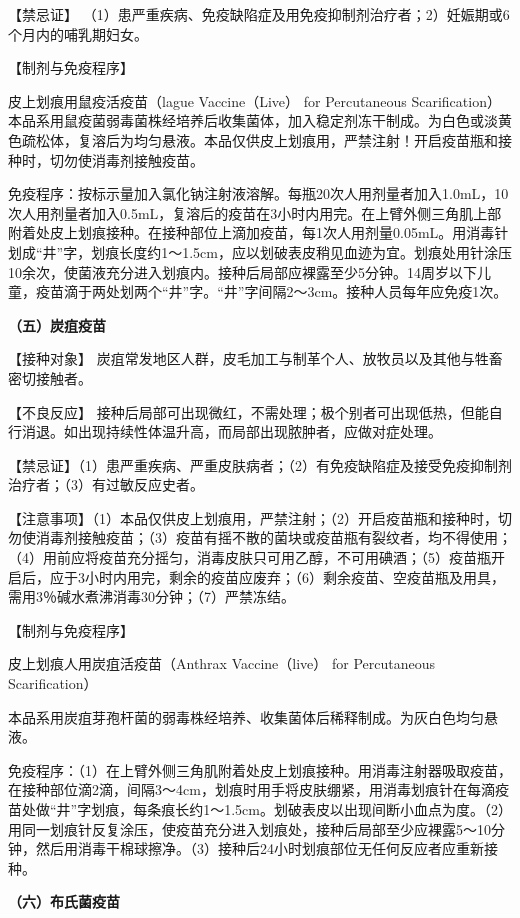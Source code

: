 【禁忌证】
（1）患严重疾病、免疫缺陷症及用免疫抑制剂治疗者；2）妊娠期或6个月内的哺乳期妇女。

【制剂与免疫程序】

皮上划痕用鼠疫活疫苗（lague Vaccine（Live） for Percutaneous
Scarification）本品系用鼠疫菌弱毒菌株经培养后收集菌体，加入稳定剂冻干制成。为白色或淡黄色疏松体，复溶后为均匀悬液。本品仅供皮上划痕用，严禁注射！开启疫苗瓶和接种时，切勿使消毒剂接触疫苗。

免疫程序：按标示量加入氯化钠注射液溶解。每瓶20次人用剂量者加入1.0mL，10次人用剂量者加入0.5mL，复溶后的疫苗在3小时内用完。在上臂外侧三角肌上部附着处皮上划痕接种。在接种部位上滴加疫苗，每1次人用剂量0.05mL。用消毒针划成“井”字，划痕长度约1～1.5cm，应以划破表皮稍见血迹为宜。划痕处用针涂压10余次，使菌液充分进入划痕内。接种后局部应裸露至少5分钟。14周岁以下儿童，疫苗滴于两处划两个“井”字。“井”字间隔2～3cm。接种人员每年应免疫1次。

\textbf{（五）炭疽疫苗}

【接种对象】
炭疽常发地区人群，皮毛加工与制革个人、放牧员以及其他与牲畜密切接触者。

【不良反应】
接种后局部可出现微红，不需处理；极个别者可出现低热，但能自行消退。如出现持续性体温升高，而局部出现脓肿者，应做对症处理。

【禁忌证】（1）患严重疾病、严重皮肤病者；（2）有免疫缺陷症及接受免疫抑制剂治疗者；（3）有过敏反应史者。

【注意事项】（1）本品仅供皮上划痕用，严禁注射；（2）开启疫苗瓶和接种时，切勿使消毒剂接触疫苗；（3）疫苗有摇不散的菌块或疫苗瓶有裂纹者，均不得使用；（4）用前应将疫苗充分摇匀，消毒皮肤只可用乙醇，不可用碘酒；（5）疫苗瓶开启后，应于3小时内用完，剩余的疫苗应废弃；（6）剩余疫苗、空疫苗瓶及用具，需用3％碱水煮沸消毒30分钟；（7）严禁冻结。

【制剂与免疫程序】

皮上划痕人用炭疽活疫苗（Anthrax Vaccine（live） for Percutaneous
Scarification）

本品系用炭疽芽孢杆菌的弱毒株经培养、收集菌体后稀释制成。为灰白色均匀悬液。

免疫程序：（1）在上臂外侧三角肌附着处皮上划痕接种。用消毒注射器吸取疫苗，在接种部位滴2滴，间隔3～4cm，划痕时用手将皮肤绷紧，用消毒划痕针在每滴疫苗处做“井”字划痕，每条痕长约1～1.5cm。划破表皮以出现间断小血点为度。（2）用同一划痕针反复涂压，使疫苗充分进入划痕处，接种后局部至少应裸露5～10分钟，然后用消毒干棉球擦净。（3）接种后24小时划痕部位无任何反应者应重新接种。

\textbf{（六）布氏菌疫苗}

